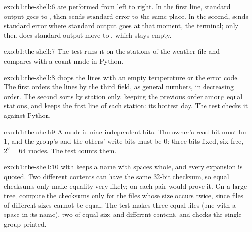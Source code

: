 \begin{solution}{exo:b1:the-shell:6}
 are performed from left to right. In the first line, standard output goes to , then
 sends standard error to the same place. In the second,  sends standard error where standard
output goes at that moment, the terminal; only then does standard output move to , which stays empty.
\end{solution}

\begin{solution}{exo:b1:the-shell:7}
The test  runs it on the stations of the weather file and compares with a count made in
Python.
\end{solution}

\begin{solution}{exo:b1:the-shell:8}
 drops the lines with an empty temperature or the error code. The first  orders the lines by
the third field, as general numbers, in decreasing order. The second sorts by station only,  keeping the
previous order among equal stations, and  keeps the first line of each station: its hottest day. The test
checks it against Python.
\end{solution}

\begin{solution}{exo:b1:the-shell:9}
A mode is nine independent bits. The owner's read bit must be 1, and the group's and the others' write bits must be 0:
three bits fixed, six free, $2^6 = 64$ modes. The test  counts them.
\end{solution}

\begin{solution}{exo:b1:the-shell:10}
 with  keeps a name with spaces whole, and every expansion is quoted. Two different contents can
have the same 32-bit checksum, so equal checksums only make equality very likely;  on each pair would prove
it. On a large tree, compute the checksums only for the files whose size occurs twice, since files of different sizes
cannot be equal. The test makes three equal files (one with a space in its name), two of equal size and different
content, and checks the single group printed.
\end{solution}

